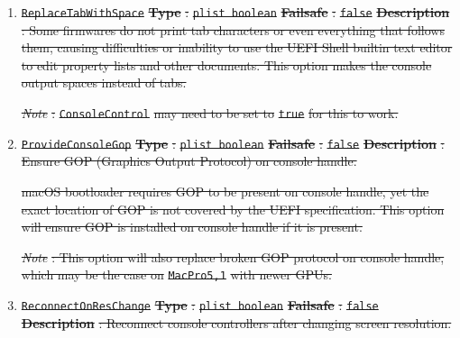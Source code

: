 \documentclass[]{article}
\providecommand{\DIFdeltex}[1]{{\protect\color{red}\sout{#1}}}                      %
\providecommand{\DIFdel}[1]{\texorpdfstring{\DIFdeltex{#1}}{}} %
\begin{document}
\begin{enumerate}
\item%
\texttt{\DIFdel{ReplaceTabWithSpace}}%
\textbf{\DIFdel{Type}}%
\DIFdel{: }\texttt{\DIFdel{plist\ boolean}}%
\textbf{\DIFdel{Failsafe}}%
\DIFdel{: }\texttt{\DIFdel{false}}%
\textbf{\DIFdel{Description}}%
\DIFdel{: Some firmwares do not print tab characters or even everything 
  that follows them, causing difficulties or inability to use the UEFI Shell builtin 
  text editor to edit property lists and other documents. This option makes the console
  output spaces instead of tabs. 
}%

\emph{\DIFdel{Note}}%
\DIFdel{: }\texttt{\DIFdel{ConsoleControl}} %
\DIFdel{may need to be set to
  }\texttt{\DIFdel{true}} %
\DIFdel{for this to work.
}%

\item%
\texttt{\DIFdel{ProvideConsoleGop}}%
\textbf{\DIFdel{Type}}%
\DIFdel{: }\texttt{\DIFdel{plist\ boolean}}%
\textbf{\DIFdel{Failsafe}}%
\DIFdel{: }\texttt{\DIFdel{false}}%
\textbf{\DIFdel{Description}}%
\DIFdel{: Ensure GOP (Graphics Output Protocol) on console handle.
}%

\DIFdel{macOS bootloader requires GOP to be present on console handle, yet the exact
  location of GOP is not covered by the UEFI specification. This option will
  ensure GOP is installed on console handle if it is present.
}%

\emph{\DIFdel{Note}}%
\DIFdel{: This option will also replace broken GOP protocol on console handle,
  which may be the case on }\texttt{\DIFdel{MacPro5,1}} %
\DIFdel{with newer GPUs.
}%

\item%
\texttt{\DIFdel{ReconnectOnResChange}}%
\textbf{\DIFdel{Type}}%
\DIFdel{: }\texttt{\DIFdel{plist\ boolean}}%
\textbf{\DIFdel{Failsafe}}%
\DIFdel{: }\texttt{\DIFdel{false}}%
\textbf{\DIFdel{Description}}%
\DIFdel{: Reconnect console controllers after changing screen resolution.
}%


\end{enumerate}
\end{document}
